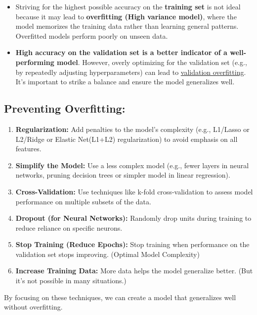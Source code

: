 \documentclass[12pt]{article}
\begin{document}
	\begin{itemize}
		\item 
		Striving for the highest possible accuracy on the  \textbf{training set} is not ideal because it may lead to \textbf{overfitting (High variance model)}, where the model memorizes the training data rather than learning general patterns. Overfitted models perform poorly on unseen data.
	
		\item 
		\textbf{High accuracy on the validation set is a better indicator of a well-performing model}. However, overly optimizing for the validation set (e.g., by repeatedly adjusting hyperparameters) can lead to \underline{validation overfitting}. It's important to strike a balance and ensure the model generalizes well.
	\end{itemize}	

	\subsection{Preventing Overfitting:}	
	\begin{enumerate}
		\item \textbf{Regularization:} Add penalties to the model's complexity (e.g., L1/Lasso or L2/Ridge or Elastic Net(L1+L2) regularization) to avoid emphasis on all features. 
	
		\item \textbf{Simplify the Model:} Use a less complex model (e.g., fewer layers in neural networks, pruning decision trees or simpler model in linear regression).
	
		\item \textbf{Cross-Validation:} Use techniques like k-fold cross-validation to assess model performance on multiple subsets of the data.
	
		\item \textbf{Dropout (for Neural Networks):} Randomly drop units during training to reduce reliance on specific neurons.
	
		\item \textbf{Stop Training (Reduce Epochs):} Stop training when performance on the validation set stops improving. (Optimal Model Complexity)
	
	
		\item \textbf{Increase Training Data:} More data helps the model generalize better. (But it's not possible in many situations.)
	\end{enumerate}	
	By focusing on these techniques, we can create a model that generalizes well without overfitting.
	
\end{document}
